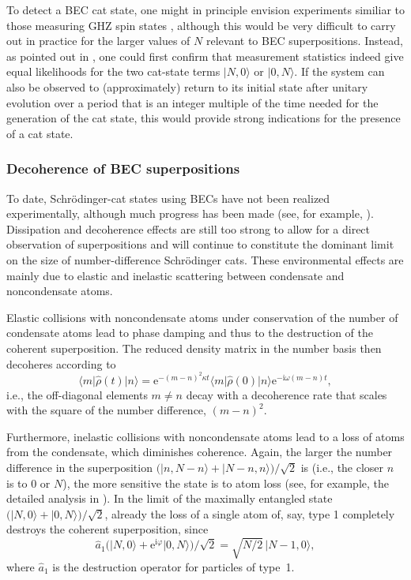 \documentclass[12pt,aps,floatfix,amsmath,amssymb,showpacs,nofootinbib]{revtex4-2}
\newcommand{\be}{\begin{equation}} \newcommand{\ee}{\end{equation}}
\newcommand{\ket}[1]{\ensuremath{|{#1\rangle}}}
\newcommand{\bra}[1]{\ensuremath{{\langle #1}|}}
\newcommand{\e}{\ensuremath{\mathrm{e}}}
\begin{document}
To detect a BEC cat state, one might in principle envision experiments
similiar to those measuring GHZ spin states
\cite{Mermin:1990:un,Dalvit:2000:bb,Sackett:2000:uu}, although this
would be very difficult to carry out in practice for the larger values
of $N$ relevant to BEC superpositions. Instead, as pointed out in
\cite{Dalvit:2000:bb}, one could first confirm that measurement
statistics indeed give equal likelihoods for the two cat-state terms
$\ket{N,0}$ or $\ket{0,N}$. If the system can also be observed to
(approximately) return to its initial state after unitary evolution
over a period that is an integer multiple of the time needed for the
generation of the cat state, this would provide strong indications for
the presence of a cat state.

\subsubsection{Decoherence of BEC superpositions}

To date, Schr\"odinger-cat states using BECs have not been realized
experimentally, although much progress has been made (see, for
example, \cite{Albiez:2004:nn}). Dissipation and decoherence
effects are still too strong to allow for a direct observation of
superpositions and will continue to constitute the dominant limit on
the size of number-difference Schr\"odinger cats. These environmental
effects are mainly due to elastic and inelastic scattering between
condensate and noncondensate atoms.

Elastic collisions with noncondensate atoms under conservation of the
number of condensate atoms lead to phase damping and thus to the
destruction of the coherent superposition. The reduced density matrix
in the number basis then decoheres according to \cite{Louis:2001:mu}
%
\be
\bra{m}\widehat{\rho}(t)\ket{n} =  \e^{-(m-n)^2
  \kappa t}  \bra{m}\widehat{\rho}(0)\ket{n} \e^{-\mathrm{i}\omega(m-n)t},
\ee
%
i.e., the off-diagonal elements $m\not= n$ decay with a decoherence
rate that scales with the square of the number difference, $(m-n)^2$.

Furthermore, inelastic collisions with noncondensate atoms lead to a
loss of atoms from the condensate, which diminishes coherence.  Again,
the larger the number difference in the superposition $\bigr(
\ket{n,N-n} + \ket{N-n,n}\bigr) / \sqrt{2}$ is (i.e., the closer $n$
is to $0$ or $N$), the more sensitive the state is to atom loss (see,
for example, the detailed analysis in \cite{Dunningham:2001:da}).
In the limit of the maximally entangled state $\bigl( \ket{N,0} +
\ket{0,N} \bigr) / \sqrt{2}$, already the loss of a single atom of,
say, type 1 completely destroys the coherent superposition, since
%
\be
\widehat{a}_1 \bigl( \ket{N,0} + \e^{\mathrm{i}\varphi} \ket{0,N} \bigr) / \sqrt{2} = \sqrt{N/2
} \, \ket{N-1,0},
\ee
%
where $\widehat{a}_1$ is the destruction operator for particles of
type~1. 
\end{document}

